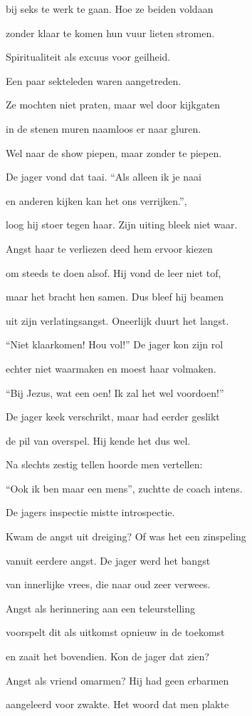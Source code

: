 bij seks te werk te gaan.
Hoe ze beiden voldaan

zonder klaar te komen
hun vuur lieten stromen.

Spiritualiteit
als excuus voor geilheid.

Een paar sekteleden
waren aangetreden.

Ze mochten niet praten,
maar wel door kijkgaten

in de stenen muren
naamloos er naar gluren.

Wel naar de show piepen,
maar zonder te piepen.

De jager vond dat taai.
“Als alleen ik je naai

en anderen kijken
kan het ons verrijken.”,

loog hij stoer tegen haar.
Zijn uiting bleek niet waar.

Angst haar te verliezen
deed hem ervoor kiezen

om steeds te doen alsof.
Hij vond de leer niet tof,

maar het bracht hen samen.
Dus bleef hij beamen

uit zijn verlatingsangst.
Oneerlijk duurt het langst.

“Niet klaarkomen! Hou vol!”
De jager kon zijn rol

echter niet waarmaken
en moest haar volmaken.

“Bij Jezus, wat een oen!
Ik zal het wel voordoen!”

De jager keek verschrikt,
maar had eerder geslikt

de pil van overspel.
Hij kende het dus wel.

Na slechts zestig tellen
hoorde men vertellen:

“Ook ik ben maar een mens”,
zuchtte de coach intens.

De jagers inspectie
mistte introspectie.

Kwam de angst uit dreiging?
Of was het een zinspeling

vanuit eerdere angst.
De jager werd het bangst

van innerlijke vrees,
die naar oud zeer verwees.

Angst als herinnering
aan een teleurstelling

voorspelt dit als uitkomst
opnieuw in de toekomst

en zaait het bovendien.
Kon de jager dat zien?

Angst als vriend omarmen?
Hij had geen erbarmen

aangeleerd voor zwakte.
Het woord dat men plakte

